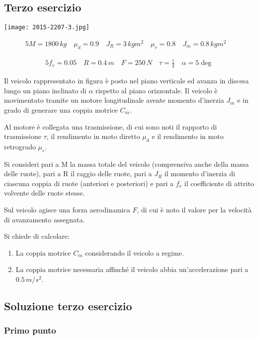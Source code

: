 \documentclass[main.tex]{subfiles}
\begin{document}
\subsection{Terzo esercizio}

\texttt{[image: 2015-2207-3.jpg]}

\begin{alignat*}{5}
  M=1800\,kg\quad
  \mu_d = 0.9\quad
  J_R = 3\,kgm^2\quad
  \mu_r =0.8\quad
  J_m=0.8\,kg m^2\quad
\end{alignat*}

\begin{alignat*}{5}
  f_v = 0.05\quad
  R = 0.4\,m\quad
  F = 250\,N\quad
 \tau = \frac{1}{4}\quad
 \alpha = 5\deg
\end{alignat*}

Il veicolo rappresentato in figura è posto nel piano verticale ed avanza in discesa lungo un piano inclinato di $\alpha$ rispetto al piano orizzontale. Il veicolo è movimentato tramite un motore longitudinale avente momento d'inerzia $J_m$ e in grado di generare una coppia motrice $C_m$.

Al motore è collegata una trasmissione, di cui sono noti il rapporto di trasmissione $\tau$, il rendimento in moto diretto $\mu_d$ e il rendimento in moto retrogrado $\mu_r$.

Si consideri pari a M la massa totale del veicolo (comprensiva anche della massa delle ruote), pari a R il raggio delle ruote, pari a $J_R$ il momento d'inerzia di ciascuna coppia di ruote (anteriori e posteriori) e pari a $f_v$ il coefficiente di attrito volvente delle ruote stesse.

Sul veicolo agisce una forza aerodinamica $F$, di cui è noto il valore per la velocità di avanzamento assegnata.

Si chiede di calcolare:
\begin{enumerate}
	\item La coppia motrice $C_m$ considerando il veicolo a regime.
	\item La coppia motrice necessaria affinché il veicolo abbia un'accelerazione pari a $0.5\,m/s^2$.
\end{enumerate}

\clearpage

\subsection{Soluzione terzo esercizio}
\subsubsection{Primo punto}
\end{document}
